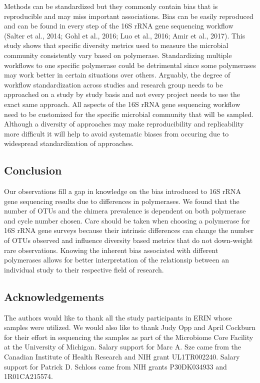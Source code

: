 \documentclass[11pt,]{article}
\begin{document}
Methods can be standardized but they commonly contain bias that is
reproducible and may miss important associations. Bias can be easily
reproduced and can be found in every step of the 16S rRNA gene
sequencing workflow (Salter et al., 2014; Gohl et al., 2016; Luo et al.,
2016; Amir et al., 2017). This study shows that specific diversity
metrics used to measure the microbial community consistently vary based
on polymerase. Standardizing multiple workflows to one specific
polymerase could be detrimental since some polymerases may work better
in certain situations over others. Arguably, the degree of workflow
standardization across studies and research group needs to be approached
on a study by study basis and not every project needs to use the exact
same approach. All aspects of the 16S rRNA gene sequencing workflow need
to be customized for the specific microbial community that will be
sampled. Although a diversity of approaches may make reproducibility and
replicability more difficult it will help to avoid systematic biases
from occuring due to widespread standardization of approaches.

\newpage

\subsection{Conclusion}\label{conclusion}

Our observations fill a gap in knowledge on the bias introduced to 16S
rRNA gene sequencing results due to differences in polymerases. We found
that the number of OTUs and the chimera prevalence is dependent on both
polymerase and cycle number chosen. Care should be taken when choosing a
polymerase for 16S rRNA gene surveys because their intrinsic differences
can change the number of OTUs observed and influence diversity based
metrics that do not down-weight rare observations. Knowing the inherent
bias associated with different polymerases allows for better
interpretation of the relationsip between an individual study to their
respective field of research.

\newpage

\subsection{Acknowledgements}\label{acknowledgements}

The authors would like to thank all the study participants in ERIN whose
samples were utilized. We would also like to thank Judy Opp and April
Cockburn for their effort in sequencing the samples as part of the
Microbiome Core Facility at the University of Michigan. Salary support
for Marc A. Sze came from the Canadian Institute of Health Research and
NIH grant UL1TR002240. Salary support for Patrick D. Schloss came from
NIH grants P30DK034933 and 1R01CA215574.
\end{document}
